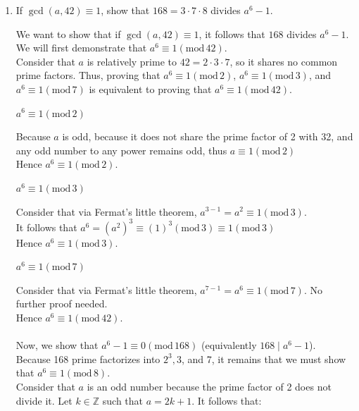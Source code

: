 \documentclass[10pt,oneside]{book}
\newcommand{\Z}{\mathbb{Z}}\newcommand{\R}{\mathbb{R}}\newcommand{\N}{\mathbb{N}}
\newcommand{\gspc}{\vspace{0.13cm}} %
\newcommand{\gline}{\gspc\\} %
\newcommand{\gmod}{\text{mod}\,}
\newcommand{\centerit}[1]{{\begin{center} #1 \end{center}}}
\newcommand{\ul}[1]{\underline{#1}}
\let\endoldproof\endproof
\renewenvironment{proof}[1][\proofname]
  {\vspace{0.2cm}\begin{adjustwidth}{2em}{2em}
   \oldproof[#1]}
  {\endoldproof
\end{adjustwidth}}
\begin{document}
\begin{enumerate}
\begin{enumerate}
\begin{proof}
\begin{align*}
			\end{align*}
			Hence, $a^{12}\equiv 1(\gmod 7)$.
			\centerit{\ul{$a^{12}\equiv 1 (\gmod 5)$}}
			Via Fermat's little theorem, we have that $a^{4}\equiv 1 (\gmod 5)$. \\
			It follows that: 
			\begin{align*}
				a^{12}&=(a^{4})^3\\
				&\equiv (1)^3(\gmod 5)\\
				&\equiv 1 (\gmod 5)
			\end{align*}
			Thus, $a^{12}\equiv 1(\gmod 5)$.
		\end{proof}
		Hence, because $a^{12}\equiv 1(\gmod 7)$ and $a^{12}\equiv 1(\gmod 5)$, it follows that \\$a^{12}\equiv 1(\gmod 35)$, as desired. 
		\item If $\gcd(a,42)\equiv 1$, show that $168 = 3\cdot 7 \cdot 8$ divides $a^6 - 1$. 
		\begin{proof}
			We want to show that if $\gcd(a,42)\equiv 1$, it follows that $168$ divides $a^6 - 1$.\gline
			We will first demonstrate that $a^6 \equiv 1(\gmod 42)$. \gline
			Consider that $a$ is relatively prime to $42 = 2\cdot 3\cdot 7$, so it shares no common prime factors. Thus, proving that $a^6\equiv 1(\gmod 2)$, $a^6\equiv 1(\gmod 3)$, and $a^6\equiv 1(\gmod 7)$ is equivalent to proving that $a^6\equiv 1(\gmod 42)$.
			\pagebreak
			\centerit{\ul{$a^6\equiv 1 (\gmod 2)$}}
			Because $a$ is odd, because it does not share the prime factor of 2 with 32, and any odd number to any power remains odd, thus $a\equiv 1 (\gmod 2)$ \\
			Hence $a^6\equiv 1 (\gmod 2)$. 
			\centerit{\ul{$a^6\equiv 1 (\gmod 3)$}}
			Consider that via Fermat's little theorem, $a^{3-1}=a^2\equiv 1(\gmod 3)$.\\
			It follows that $a^6 = (a^2)^3 \equiv (1)^3(\gmod 3) \equiv 1 (\gmod 3)$\\
			Hence $a^6\equiv 1 (\gmod 3)$. 
			\centerit{\ul{$a^6\equiv 1 (\gmod 7)$}}
			Consider that via Fermat's little theorem, $a^{7-1}=a^6\equiv 1(\gmod 7)$. No further proof needed.\gline
			Hence $a^6\equiv 1 (\gmod 42)$. \\\\
			Now, we show that $a^6 - 1\equiv 0 (\gmod 168)$ (equivalently $168\mid a^6 - 1$). \gline
			Because 168 prime factorizes into $2^3,3$, and 7, it remains that we must show that $a^6\equiv 1 (\gmod 8)$. \gline
			Consider that $a$ is an odd number because the prime factor of 2 does not divide it. Let $k\in \Z$ such that $a = 2k + 1$. It follows that:

\end{proof}
\end{enumerate}
\end{enumerate}
\end{document}
